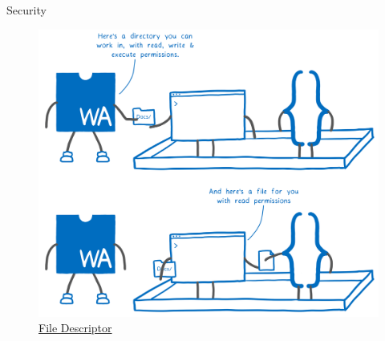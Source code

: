 \documentclass{beamer}
\begin{document}
\begin{frame}{Security}
     \begin{figure}
        \includegraphics[scale=0.06]{./images/file.png}
        \caption{\href{https://hacks.mozilla.org/2019/03/standardizing-wasi-a-webassembly-system-interface/}{File Descriptor}}
    \end{figure}
\end{frame}
\end{document}
